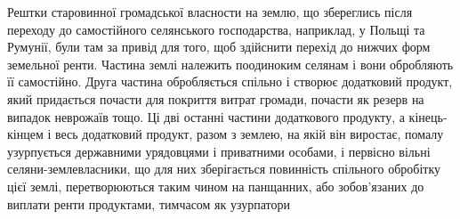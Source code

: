 Рештки старовинної громадської власности на землю, що збереглись після
переходу до самостійного селянського господарства, наприклад, у Польщі та
Румунії, були там за привід для того, щоб здійснити перехід до нижчих форм
земельної ренти. Частина землі належить поодиноким селянам і вони обробляють
її самостійно. Друга частина обробляється спільно і створює додатковий
продукт, який придається почасти для покриття витрат громади, почасти як
резерв на випадок неврожаїв тощо. Ці дві останні частини додаткового продукту,
а кінець-кінцем і весь додатковий продукт, разом з землею, на якій він виростає,
помалу узурпується державними урядовцями і приватними особами,
і первісно вільні селяни-землевласники, що для них зберігається повинність
спільного обробітку цієї землі, перетворюються таким чином на панщанних,
або зобов’язаних до виплати ренти продуктами, тимчасом як узурпатори